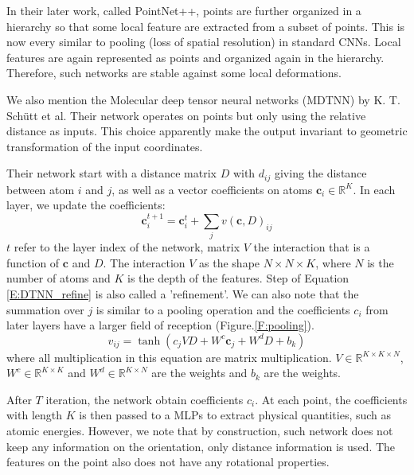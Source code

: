 \documentclass{article}
\begin{document}
In their later work, called PointNet++\cite{qi_pointnet_2017-1}, points are further organized in a hierarchy so that some local feature are extracted from a subset of 
points. This is now every similar to pooling (loss of spatial resolution) in standard CNNs. 
Local features are again represented as points and organized again in the hierarchy. Therefore, such networks are stable against
some local deformations.

We also mention the Molecular deep tensor neural networks (MDTNN) by K. T. Sch\"{u}tt et al.\cite{schutt_quantum-chemical_2017} 
Their network operates on points but only 
using the relative distance as inputs. This choice apparently make the output invariant to geometric transformation of the input coordinates.

Their network start with a distance matrix $D$ with $d_{ij}$ giving the distance between atom $i$ and $j$, as well as a vector coefficients 
on atoms $\mathbf{c}_i \in \mathbb{R}^K$. 
In each layer, we update the coefficients:
\begin{equation}
    \mathbf{c}_i^{t+1} = \mathbf{c}_i^{t} + \sum_j v (\mathbf{c}, D) _{ij} \label{E:DTNN_refine}
\end{equation} 
$t$ refer to the layer index of the network,
matrix $V$ the interaction that is a function of $\mathbf{c}$ and $D$. The interaction $V$ as the shape $N\times N \times K$, where $N$ is
the number of atoms and $K$ is the depth of the features. Step of Equation \eqref{E:DTNN_refine} is also called a 'refinement'. 
We can also note that the summation over $j$ is similar to a pooling operation and the coefficients $c_i$ from later layers have a larger
field of reception (Figure.\ref{F:pooling}).
\begin{equation}
    v_{ij} = \tanh(c_j V D + W^c \mathbf{c}_j + W^d D + b_k )
\end{equation}
where all multiplication in this equation are matrix multiplication. 
$V\in \mathbb{R}^{K\times K \times N}$, $W^c\in \mathbb{R}^{K\times K}$ and $W^d\in \mathbb{R}^{K\times N}$ are the weights and 
$b_k$ are the weights.

After $T$ iteration, the network obtain coefficients $c_i$. At each point, the coefficients with length $K$ is then passed to 
a MLPs to extract physical quantities, such as atomic energies. However, we note that by construction, such network does not keep 
any information on the orientation, only distance information is used. The features on the point also does not have any rotational 
properties.
\end{document}
